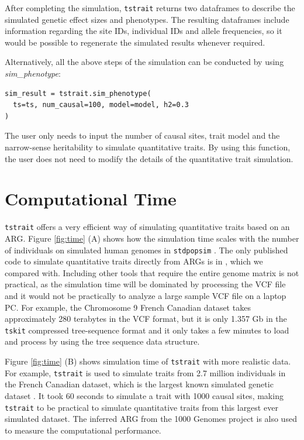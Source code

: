 \documentclass[unnumsec,webpdf,modern,large,namedate]{oup-authoring-template}%
\theoremstyle{thmstyleone}%
\theoremstyle{thmstyletwo}%
\theoremstyle{thmstylethree}%
\begin{document}
After completing the simulation, \texttt{tstrait} returns two dataframes to
describe the simulated genetic effect sizes and phenotypes. The resulting
dataframes include information regarding the site IDs, individual IDs and
allele frequencies, so it would be possible to regenerate the simulated results
whenever required.

Alternatively, all the above steps of the simulation can be conducted by using
\emph{sim\_phenotype}:
\begin{verbatim}
sim_result = tstrait.sim_phenotype(
  ts=ts, num_causal=100, model=model, h2=0.3
)
\end{verbatim}
The user only needs to input the number of causal sites, trait model and the
narrow-sense heritability to simulate quantitative traits. By using this
function, the user does not need to modify the details of the quantitative
trait simulation.

\section{Computational Time}

\texttt{tstrait} offers a very efficient way of simulating quantitative traits
based on an ARG. Figure \ref{fig:time} (A) shows how the simulation time scales
with the number of individuals on simulated human genomes in \texttt{stdpopsim}
\citep{adrion2020}. The only published code to simulate quantitative traits
directly from ARGs is in \cite{martin2017}, which we compared with. Including
other tools that require the entire genome matrix is not practical, as the
simulation time will be dominated by processing the VCF file and it would not
be practically to analyze a large sample VCF file on a laptop PC. For example,
the Chromosome 9 French Canadian dataset takes approximately 280 terabytes in
the VCF format, but it is only 1.357 Gb in the \texttt{tskit} compressed
tree-sequence format and it only takes a few minutes to load and process by
using the tree sequence data structure.

Figure \ref{fig:time} (B) shows simulation time of \texttt{tstrait} with more
realistic data. For example, \texttt{tstrait} is used to simulate traits from
2.7 million individuals in the French Canadian dataset, which is the largest
known simulated genetic dataset \citep{anderson2023}. It took 60 seconds to
simulate a trait with 1000 causal sites, making \texttt{tstrait} to be
practical to simulate quantitative traits from this largest ever simulated
dataset. The inferred ARG from the 1000 Genomes project \citep{kelleher2019} is
also used to measure the computational performance.
\end{document}
